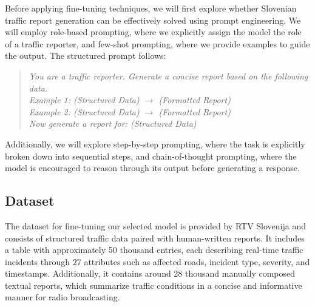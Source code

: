 \documentclass[fleqn,moreauthors,10pt]{ds_report}
\begin{document}
Before applying fine-tuning techniques, we will first explore whether Slovenian traffic report generation can be effectively solved using prompt engineering. We will employ role-based prompting, where we explicitly assign the model the role of a traffic reporter, and few-shot prompting, where we provide examples to guide the output. The structured prompt follows:

\begin{quote}
\textit{You are a traffic reporter. Generate a concise report based on the following data.} \\ 

\textit{Example 1: (Structured Data) $\rightarrow$ (Formatted Report)} \\
\textit{Example 2: (Structured Data) $\rightarrow$ (Formatted Report)} \\
\textit{Now generate a report for: (Structured Data)}
\end{quote}

Additionally, we will explore step-by-step prompting, where the task is explicitly broken down into sequential steps, and chain-of-thought prompting, where the model is encouraged to reason through its output before generating a response.

\subsection*{Dataset}

The dataset for fine-tuning our selected model is provided by RTV Slovenija and consists of structured traffic data paired with human-written reports. It includes a table with approximately 50 thousand entries, each describing real-time traffic incidents through 27 attributes such as affected roads, incident type, severity, and timestamps. Additionally, it contains around 28 thousand manually composed textual reports, which summarize traffic conditions in a concise and informative manner for radio broadcasting.





\end{document}
